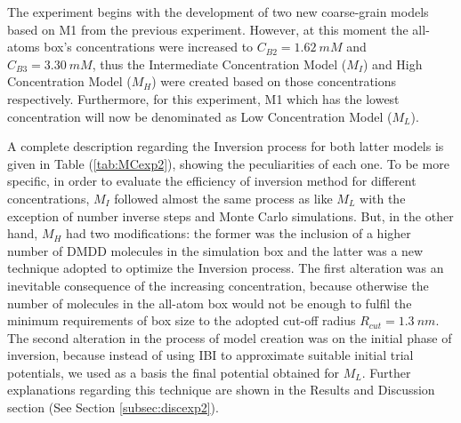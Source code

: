 \documentclass[10pt,a4paper,twoside]{article}
\begin{document}
 The experiment begins with the development of two new coarse-grain models based on M1 from the previous experiment. However, at this moment the all-atoms box's concentrations were increased to $C_{B2} = 1.62\ mM$ and $C_{B3} = 3.30\ mM$, thus the Intermediate Concentration Model ($M_{I}$) and High Concentration Model ($M_{H}$) were created based on those concentrations respectively. Furthermore, for this experiment, M1 which has the lowest concentration will now be denominated as Low Concentration Model ($M_{L}$).
 
  A complete description regarding the Inversion process for both latter models is given in Table (\ref{tab:MCexp2}), showing the peculiarities of each one. To be more specific, in order to evaluate the efficiency of inversion method for different concentrations, $M_{I}$ followed almost the same process as like $M_{L}$ with the exception of number inverse steps and Monte Carlo simulations. But, in the other hand, $M_{H}$ had two modifications: the former was the inclusion of a higher number of DMDD molecules in the simulation box and the latter was a new technique adopted to optimize the Inversion process. The first alteration was an inevitable consequence of the increasing  concentration, because otherwise the number of molecules in the all-atom box would not be enough to fulfil the minimum requirements of box size to the adopted cut-off radius $R_{cut} = 1.3 \ nm$. The second alteration in the process of model creation was on the initial phase of inversion, because instead of using IBI to approximate suitable initial trial potentials, we used as a basis the final potential obtained for $M_{L}$. Further explanations regarding this technique are shown in  the Results and Discussion section (See Section \ref{subsec:discexp2}).
\end{document}
